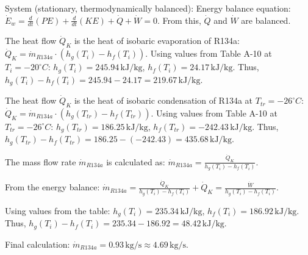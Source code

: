 System (stationary, thermodynamically balanced):  
Energy balance equation:  
\( \dot{E}_w = \frac{d}{dt}(PE) + \frac{d}{dt}(KE) + \dot{Q} + \dot{W} = 0 \).  
From this, \( \dot{Q} \) and \( \dot{W} \) are balanced.  

The heat flow \( \dot{Q}_K \) is the heat of isobaric evaporation of R134a:  
\( \dot{Q}_K = \dot{m}_{R134a} \cdot (h_{g}(T_i) - h_{f}(T_i)) \).  
Using values from Table A-10 at \( T_i = -20^\circ C \):  
\( h_{g}(T_i) = 245.94 \, \text{kJ/kg} \), \( h_{f}(T_i) = 24.17 \, \text{kJ/kg} \).  
Thus, \( h_{g}(T_i) - h_{f}(T_i) = 245.94 - 24.17 = 219.67 \, \text{kJ/kg} \).  

The heat flow \( \dot{Q}_K \) is the heat of isobaric condensation of R134a at \( T_{tr} = -26^\circ C \):  
\( \dot{Q}_K = \dot{m}_{R134a} \cdot (h_{g}(T_{tr}) - h_{f}(T_{tr})) \).  
Using values from Table A-10 at \( T_{tr} = -26^\circ C \):  
\( h_{g}(T_{tr}) = 186.25 \, \text{kJ/kg} \), \( h_{f}(T_{tr}) = -242.43 \, \text{kJ/kg} \).  
Thus, \( h_{g}(T_{tr}) - h_{f}(T_{tr}) = 186.25 - (-242.43) = 435.68 \, \text{kJ/kg} \).  

The mass flow rate \( \dot{m}_{R134a} \) is calculated as:  
\( \dot{m}_{R134a} = \frac{\dot{Q}_K}{h_{g}(T_i) - h_{f}(T_i)} \).  

From the energy balance:  
\( \dot{m}_{R134a} = \frac{\dot{Q}_K}{h_{g}(T_i) - h_{f}(T_i)} + \dot{Q}_K = \frac{\dot{W}}{h_{g}(T_i) - h_{f}(T_i)} \).  

Using values from the table:  
\( h_{g}(T_i) = 235.34 \, \text{kJ/kg} \), \( h_{f}(T_i) = 186.92 \, \text{kJ/kg} \).  
Thus, \( h_{g}(T_i) - h_{f}(T_i) = 235.34 - 186.92 = 48.42 \, \text{kJ/kg} \).  

Final calculation:  
\( \dot{m}_{R134a} = 0.93 \, \text{kg/s} \approx 4.69 \, \text{kg/s} \).